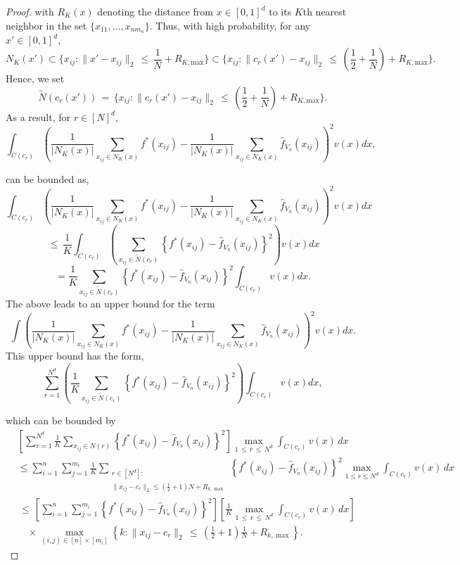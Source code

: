 \documentclass[twoside,11pt]{article}
\makeatletter
\newcommand{\discardlabel}[1]{}
\newcommand{\discardtwo}[2]{}
\newcommand{\legacyref}[1]{\textup{[source ref.]}}
\newcommand{\legacyeqref}[1]{\textup{[source equation]}}
\newenvironment{legacycomparison}{%
  \begingroup\color{legacygray}%
  \let\label\discardlabel
  \let\originallabel\discardlabel
  \let\ref\legacyref
  \let\pageref\legacyref
  \let\eqref\legacyeqref
  \let\cref\legacyref
  \let\Cref\legacyref
  \let\autoref\legacyref
  \let\aliasref\discardtwo
}{\endgroup}
\newcommand{\aliasref}[2]{%
  \@ifundefined{r@#2}{}{%
    \expandafter\let\csname r@#1\expandafter\endcsname\csname r@#2\endcsname}}
\makeatother
\begin{document}
\begin{legacycomparison}
\begin{proof}
with \(R_K(x)\) denoting the distance from \(x \in [0, 1]^d\) to its \(K\)th nearest neighbor in the set \(\{x_{11}, \ldots, x_{nm_n}\}\). Thus, with high probability, for any \(x' \in [0, 1]^d\),
\[
N_K(x') \subset \{x_{ij} : \|x' - x_{ij}\|_2 \,\leq\, \frac{1}{N} + R_{K,\text{max}}\} 
\subset \{x_{ij} : \|c_r(x') - x_{ij}\|_2 \,\leq\, \left(\frac{1}{2} + \frac{1}{N}\right) + R_{K,\text{max}}\}.
\]
Hence, we set
\[
\tilde N(c_r(x')) \,=\, \{x_{ij} : \|c_r(x') - x_{ij}\|_2 \,\leq\, \left(\frac{1}{2} + \frac{1}{N}\right) + R_{K,\text{max}}\}.
\]
As a result, for \(r \in [N]^d\),
\[
\int_{C(c_r)} \left( \frac{1}{{|N_K(x)|}} \sum_{x_{ij} \in N_K(x)} f^*(x_{ij}) - \frac{1}{{|N_K(x)|}} \sum_{x_{ij} \in N_K(x)} \hat{f}_{V_n}(x_{ij}) \right)^2 v(x)dx,
\]

can be bounded as,
\[
\int_{C(c_r)} \left( \frac{1}{{|N_K(x)|}} \sum_{x_{ij} \in N_K(x)} f^*(x_{ij}) - \frac{1}{{|N_K(x)|}} \sum_{x_{ij} \in N_K(x)} \hat{f}_{V_n}(x_{ij}) \right)^2 v(x)dx
\]
\[
\,\leq\, \frac{1}{K} \int_{C(c_r)} \left( \sum_{x_{ij} \in \tilde N(c_r)} \left\{ f^*(x_{ij}) - \hat{f}_{V_n}(x_{ij}) \right\}^2 \right) v(x)dx
\]
\[
= \frac{1}{K} \sum_{x_{ij} \in \tilde N(c_r)} \left\{ f^*(x_{ij}) - \hat{f}_{V_n}(x_{ij}) \right\}^2 \int_{C(c_r)} v(x)dx.
\]
The above leads to an upper bound for the term
\[
\int \left( \frac{1}{{|N_K(x)|}} \sum_{x_{ij} \in N_K(x)} f^*(x_{ij}) - \frac{1}{{|N_K(x)|}} \sum_{x_{ij} \in N_K(x)} \hat{f}_{V_n}(x_{ij}) \right)^2 v(x)dx.
\]
This upper bound has the form,
\[
\sum_{r=1}^{N^d} \left( \frac{1}{K} \sum_{x_{ij} \in \tilde N(c_r)} \left\{ f^*(x_{ij}) - \hat{f}_{V_n}(x_{ij}) \right\}^2 \right) \int_{C(c_r)} v(x)dx,
\]

which can be bounded by
\begin{align*}
&\left[ \sum_{r=1}^{N^d} \frac{1}{K} \sum_{x_{ij} \in N(r)} \left\{ f^*(x_{ij}) - \hat{f}_{V_n}(x_{ij}) \right\}^2 \right] \max_{1 \,\leq\, r \,\leq\, N^d} \int_{C(c_r)} v(x) \, dx \\
&\leq \sum_{i=1}^{n} \sum_{j=1}^{m_i} \frac{1}{K} \sum_{\substack{r \in [N^d] : \\ \|x_{ij} - c_r\|_2 \leq (\frac{1}{2}+1)N + R_{k,\max}}} \left\{ f^*(x_{ij}) - \hat{f}_{V_n}(x_{ij}) \right\}^2 \max_{1 \leq r \leq N^d} \int_{C(c_r)} v(x) \, dx \\
&\,\leq\, \left[\sum_{i=1}^{n} \sum_{j=1}^{m_i} \left\{ f^*(x_{ij}) - \hat{f}_{V_n}(x_{ij}) \right\}^2 \right]\left[ \frac{1}{K} \max_{1 \,\leq\, r \,\leq\, N^d} \int_{C(c_r)} v(x) \, dx \right] \\
&\quad \times \max_{(i,j) \in [n] \times [m_i]} \left\{ k : \|x_{ij} - c_r\|_2 \,\leq\, \left( \frac{1}{2} + 1 \right) \frac{1}{N} + R_{k,\max} \right\}.
\end{align*}


\end{proof}
\end{legacycomparison}
\end{document}
